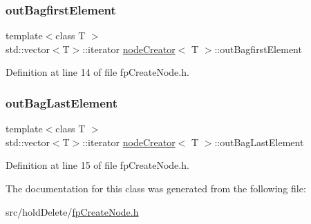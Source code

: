 \subsubsection{\texorpdfstring{out\+Bagfirst\+Element}{outBagfirstElement}}
{\footnotesize\ttfamily template$<$class T $>$ \\
std\+::vector$<$T$>$\+::iterator \hyperlink{classnodeCreator}{node\+Creator}$<$ T $>$\+::out\+Bagfirst\+Element\hspace{0.3cm}{\ttfamily [private]}}



Definition at line 14 of file fp\+Create\+Node.\+h.

\mbox{\label{classnodeCreator_a53cb975b730f4a7403186b5c4230da19}} 
\subsubsection{\texorpdfstring{out\+Bag\+Last\+Element}{outBagLastElement}}
{\footnotesize\ttfamily template$<$class T $>$ \\
std\+::vector$<$T$>$\+::iterator \hyperlink{classnodeCreator}{node\+Creator}$<$ T $>$\+::out\+Bag\+Last\+Element\hspace{0.3cm}{\ttfamily [private]}}



Definition at line 15 of file fp\+Create\+Node.\+h.



The documentation for this class was generated from the following file\+:\begin{DoxyCompactItemize}
\item 
src/hold\+Delete/\hyperlink{fpCreateNode_8h}{fp\+Create\+Node.\+h}\end{DoxyCompactItemize}
